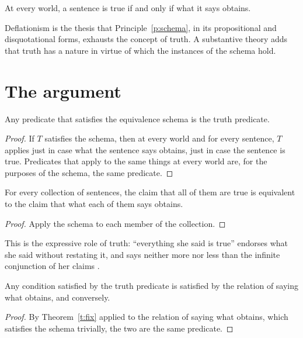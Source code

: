 \documentclass{situationist-preprint}
\begin{document}
\begin{principle}\label{p:schema}
At every world, a sentence is true if and only if what it says obtains.
\end{principle}

Deflationism is the thesis that Principle~\ref{p:schema}, in its propositional and disquotational forms, exhausts the concept of truth. A substantive theory adds that truth has a nature in virtue of which the instances of the schema hold.

\section{The argument}\label{s:arg}

\begin{theorem}\label{t:fix}
Any predicate that satisfies the equivalence schema is the truth predicate.
\end{theorem}

\begin{proof}
If $T$ satisfies the schema, then at every world and for every sentence, $T$ applies just in case what the sentence says obtains, just in case the sentence is true. Predicates that apply to the same things at every world are, for the purposes of the schema, the same predicate.
\end{proof}

\begin{proposition}\label{p:gen}
For every collection of sentences, the claim that all of them are true is equivalent to the claim that what each of them says obtains.
\end{proposition}

\begin{proof}
Apply the schema to each member of the collection.
\end{proof}

This is the expressive role of truth: \enquote{everything she said is true} endorses what she said without restating it, and says neither more nor less than the infinite conjunction of her claims \citep{Quine1970,Horwich1998}.

\begin{proposition}\label{p:surplus}
Any condition satisfied by the truth predicate is satisfied by the relation of saying what obtains, and conversely.
\end{proposition}

\begin{proof}
By Theorem~\ref{t:fix} applied to the relation of saying what obtains, which satisfies the schema trivially, the two are the same predicate.
\end{proof}
\end{document}
